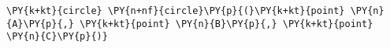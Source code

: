 \begin{Verbatim}[commandchars=\\\{\}]
    \PY{k+kt}{circle} \PY{n+nf}{circle}\PY{p}{(}\PY{k+kt}{point} \PY{n}{A}\PY{p}{,} \PY{k+kt}{point} \PY{n}{B}\PY{p}{,} \PY{k+kt}{point} \PY{n}{C}\PY{p}{)}
\end{Verbatim}
